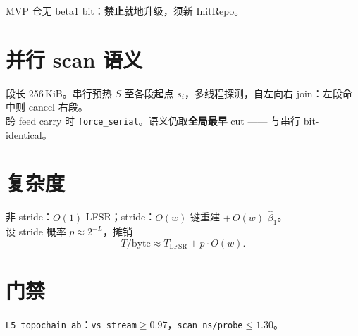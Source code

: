 MVP 仓无 beta1 bit：\textbf{禁止}就地升级，须新 InitRepo。

\section{并行 scan 语义}

段长 256\,KiB。串行预热 $S$ 至各段起点 $s_i$，多线程探测，自左向右 join：左段命中则 cancel 右段。\\
跨 feed carry 时 \texttt{force\_serial}。语义仍取\textbf{全局最早} cut —— 与串行 bit-identical。

\section{复杂度}

非 stride：$O(1)$ LFSR；stride：$O(w)$ 键重建 $+\,O(w)$ $\hat\beta_1$。\\
设 stride 概率 $p\approx 2^{-L}$，摊销
\begin{equation}
T/\mathrm{byte}\approx T_{\mathrm{LFSR}} + p\cdot O(w).
\end{equation}

\section{门禁}

\texttt{L5\_topochain\_ab}：\texttt{vs\_stream}$\ge0.97$，\texttt{scan\_ns/probe}$\le1.30$。
